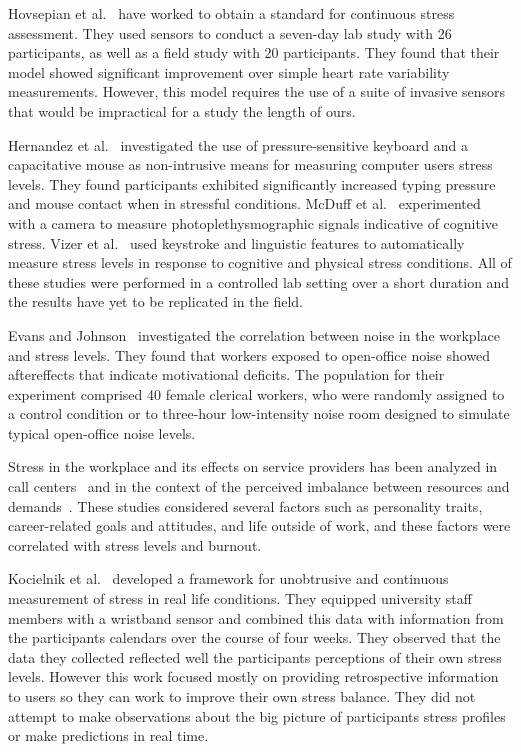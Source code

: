 Hovsepian et al.~\cite{Hovsepian15} have worked to obtain a standard for continuous stress assessment. They used sensors to conduct a seven-day lab study with 26 participants, as well as a field study with 20 participants. They found that their model showed significant improvement over simple heart rate variability measurements. However, this model requires the use of a suite of invasive sensors that would be impractical for a study the length of ours.

Hernandez et al.~\cite{Hernandez14} investigated the use of pressure-sensitive keyboard and a capacitative mouse as non-intrusive means for measuring computer users stress levels. They found participants exhibited significantly increased typing pressure and mouse contact when in stressful conditions. McDuff et al.~\cite{mcduff16} experimented with a camera to measure photoplethysmographic signals indicative of cognitive stress. Vizer et al.~\cite{vizer_automated_2009} used keystroke and linguistic features to automatically measure stress levels in response to cognitive and physical stress conditions. All of these studies were performed in a controlled lab setting over a short duration and the results have yet to be replicated in the field.

Evans and Johnson~\cite{evans00} investigated the correlation between noise in the workplace and stress levels. They found that workers exposed to open-office noise showed aftereffects that indicate motivational deficits. The population for their experiment comprised 40 female clerical workers, who were randomly assigned to a control condition or to three-hour low-intensity noise room designed to simulate typical open-office noise levels.

Stress in the workplace and its effects on service providers has been analyzed in call centers~\cite{Hernandez11} and in the context of the perceived imbalance between resources and demands~\cite{cherniss80}. These studies considered several factors such as personality traits, career-related goals and attitudes, and life outside of work, and these factors were correlated with stress levels and burnout.

Kocielnik et al.~\cite{kocielnik_smart_2013} developed a framework for unobtrusive and continuous measurement of stress in real life conditions. They equipped university staff members with a wristband sensor and combined this data with information from the participants calendars over the course of four weeks. They observed that the data they collected reflected well the participants perceptions of their own stress levels. However this work focused mostly on providing retrospective information to users so they can work to improve their own stress balance. They did not attempt to make observations about the big picture of participants stress profiles or make predictions in real time.


